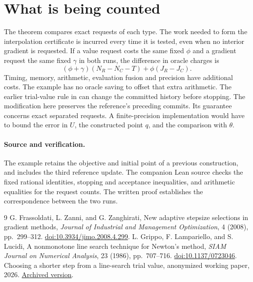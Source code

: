 \documentclass[11pt]{article}
\begin{document}
\section{What is being counted}

The theorem compares exact requests of each type. The work needed
to form the interpolation certificate is incurred every time it is
tested, even when no interior gradient is requested. If a value
request costs the same fixed \(\phi\) and a gradient request the
same fixed \(\gamma\) in both runs, the difference in oracle
charges is
\[
 (\phi+\gamma)(N_R-N_C-T)+\phi(J_R-J_C).
\]
Timing, memory, arithmetic, evaluation fusion and precision have
additional costs. The example has no oracle saving to offset that
extra arithmetic. The earlier trial-value rule in \cite{trial} can change the
committed history before stopping. The modification here preserves
the reference's preceding commits. Its guarantee concerns exact
separated requests. A finite-precision implementation would have to
bound the error in \(U\), the constructed point \(q\), and the
comparison with \(\theta\).

\paragraph{Source and verification.}
The example retains the objective and initial point of a previous
construction, and includes the third reference update. The companion
Lean source checks the fixed rational identities,
stopping and acceptance inequalities, and arithmetic equalities for
the request counts. The written proof establishes the correspondence between the two runs.
\begin{thebibliography}{9}
G. Frassoldati, L. Zanni, and G. Zanghirati,
New adaptive stepsize selections in gradient methods,
\emph{Journal of Industrial and Management Optimization},
4 (2008), pp.\ 299--312.
\href{https://doi.org/10.3934/jimo.2008.4.299}{doi:10.3934/jimo.2008.4.299}.
L. Grippo, F. Lampariello, and S. Lucidi,
A nonmonotone line search technique for Newton's method,
\emph{SIAM Journal on Numerical Analysis}, 23 (1986), pp.\ 707--716.
\href{https://doi.org/10.1137/0723046}{doi:10.1137/0723046}.
Choosing a shorter step from a line-search trial value,
anonymized working paper, 2026.
\href{https://taitai2025.github.io/assets/documents/research/trial-firsthit.pdf}
{Archived version}.
\end{thebibliography}
\end{document}
